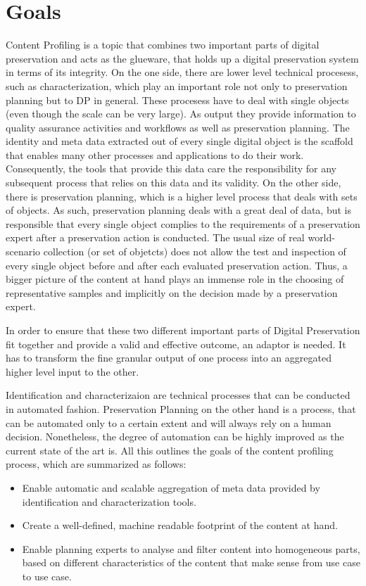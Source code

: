 \section {Goals}
\label{sec:goals}
Content Profiling is a topic that combines two important parts of digital preservation and acts as the glueware, that holds up a digital preservation system in terms of its integrity. On the one side, there are lower level technical procesess, such as characterization, which play an important role not only to preservation planning but to DP in general. These procesess have to deal with single objects (even though the scale can be very large). As output they provide information to quality assurance activities and workflows as well as preservation planning. The identity and meta data extracted out of every single digital object is the scaffold that enables many other processes and applications to do their work. Consequently, the tools that provide this data care the responsibility for any subsequent process that relies on this data and its validity.
On the other side, there is preservation planning, which is a higher level process that deals with sets of objects. As such, preservation planning deals with a great deal of data, but is responsible that every single object complies to the requirements of a preservation expert after a preservation action is conducted. The usual size of real world-scenario collection (or set of objetcts) does not allow the test and inspection of every single object before and after each evaluated preservation action. Thus, a bigger picture of the content at hand plays an immense role in the choosing of representative samples and implicitly on the decision made by a preservation expert.

In order to ensure that these two different important parts of Digital Preservation fit together and provide a valid and effective outcome, an adaptor is needed. It has to transform the fine granular output of one process into an aggregated higher level input to the other.

Identification and characterizaion are technical processes that can be conducted in automated fashion. Preservation Planning on the other hand is a process, that can be automated only to a certain extent and will always rely on a human decision. Nonetheless, the degree of automation can be highly improved as the current state of the art is. All this outlines the goals of the content profiling process, which are summarized as follows:

\begin{itemize}
\item Enable automatic and scalable aggregation of meta data provided by identification and characterization tools.
\item Create a well-defined, machine readable footprint of the content at hand.
\item Enable planning experts to analyse and filter content into homogeneous parts, based on different characteristics of the content that make sense from use case to use case.
\end{itemize}

